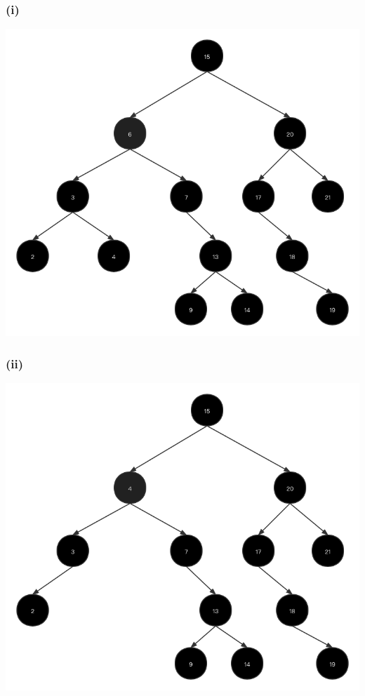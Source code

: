 \documentclass{article}
\begin{document}
\subsubsection{(i)}
\includegraphics[scale=0.4]{Figure2.png}
\subsubsection{(ii)}
\includegraphics[scale=0.4]{Figure3.png}
\end{document}
